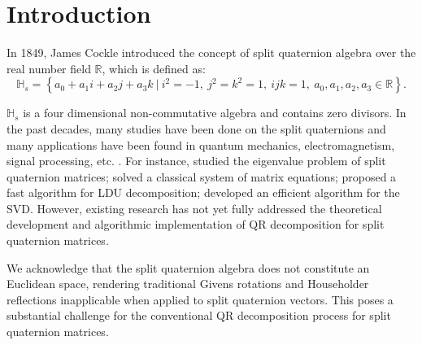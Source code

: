\documentclass[12pt]{article}
\numberwithin{equation}{section}
\begin{document}

\section{Introduction}
In 1849, James Cockle \citep{Cockle1849} introduced the concept of split quaternion algebra over the real number field $\mathbb{R}$, which is defined as:
\begin{equation*}
    \mathbb{H}_s = \left\{ a_0 + a_1 i + a_2 j + a_3 k \ \bigg| \ i^2 = -1,\ j^2 = k^2 = 1, \ ijk = 1, \ a_0, a_1, a_2, a_3 \in \mathbb{R}\right\}. 
\end{equation*} 

 $\mathbb{H}_s$ is a four dimensional non-commutative algebra and contains zero divisors. 
  In the past decades, many studies have been done on the split quaternions \citep{AR2020,Yasemin2012,TJiang2015,Jiang2018,TJiang2018,Zhuo2020,Yang2020,mma2023,wang2024,Wang2021,Gang2024,yuan2017,Zhang2015} and  many applications have been found in quantum mechanics, electromagnetism, signal processing, etc. \citep{Gog2022, Hasebe2010, Le2022, Z2022, Wang2023}. For instance, \citep{Jiang2018} studied the eigenvalue problem of split quaternion matrices; \citep{wang2024} solved a classical system of matrix equations; 
 \citep{Wang2021} proposed a fast algorithm for LDU decomposition; \citep{Gang2024} developed an efficient algorithm for the SVD. However, existing research has not yet fully addressed the theoretical development and algorithmic implementation of QR decomposition for split quaternion matrices.
 
We acknowledge that the split quaternion algebra does not constitute an Euclidean space, rendering traditional Givens rotations and Householder reflections inapplicable when applied to split quaternion vectors. This poses a substantial challenge for the conventional QR decomposition process for split quaternion matrices.
\end{document}
